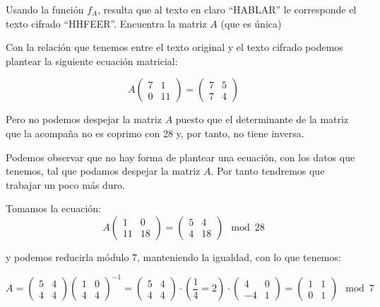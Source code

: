 \begin{problem}[2]
Usando la función $f_A$, resulta que al texto en claro ``HABLAR'' le corresponde el texto cifrado ``HHFEER''. Encuentra la matriz $A$ (que es única)

\solution



Con la relación que tenemos entre el texto original y el texto cifrado podemos plantear la siguiente ecuación matricial:

\[A\left( \begin{array}{cc}
  7 & 1 \\
  0 & 11
  \end{array} \right) = \left( \begin{array}{cc}
  7 & 5 \\
  7 & 4
  \end{array} \right)\]

Pero no podemos despejar la matriz $A$ puesto que el determinante de la matriz que la acompaña no es coprimo con 28 y, por tanto, no tiene inversa.

Podemos observar que no hay forma de plantear una ecuación, con los datos que tenemos, tal que podamos despejar la matriz $A$. Por tanto tendremos que trabajar un poco más duro.

Tomamos la ecuación:
\[A\left( \begin{array}{cc}
  1  & 0\\
  11 & 18
  \end{array} \right) = \left( \begin{array}{cc}
  5 & 4\\
  4 & 18
  \end{array} \right) \mod 28\]

y podemos reducirla módulo 7, manteniendo la igualdad, con lo que tenemos:

\[A =  \left( \begin{array}{cc}
  5 & 4\\
  4 & 4
  \end{array} \right) \left( \begin{array}{cc}
  1  & 0\\
  4 & 4
  \end{array} \right)^{-1} = \left( \begin{array}{cc}
  5 & 4\\
  4 & 4
  \end{array} \right) \cdot \left(\frac{1}{4}=2\right) \cdot \left( \begin{array}{cc}
  4  & 0\\
  -4 & 1
  \end{array} \right) = \left( \begin{array}{cc}
  1 & 1\\
  0 & 1
  \end{array} \right) \mod 7\]


\end{problem}

